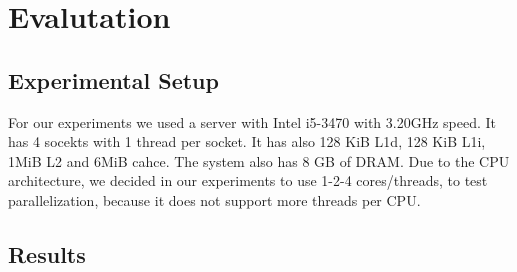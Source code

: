 \section{Evalutation}
\label{sec:experiments}

\subsection{Experimental Setup}
For our experiments we used a server with Intel i5-3470 with 3.20GHz speed. It has 4 socekts with 1 thread per socket. It has also 128 KiB L1d, 128 KiB L1i, 1MiB L2 and 6MiB cahce. The system also has 8 GB of DRAM. Due to the CPU architecture, we decided in our experiments to use 1-2-4 cores/threads, to test parallelization, because it does not support more threads per CPU.

\subsection{Results}


